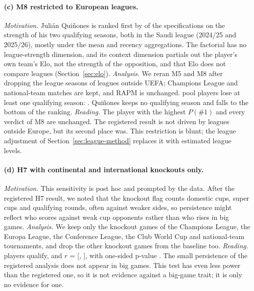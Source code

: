 \documentclass[11pt,a4paper]{article}
\begin{document}
\paragraph{(c) M8 restricted to European leagues.}
\emph{Motivation.} Julián Quiñones is ranked first by \QuinonesSpecShare{} of
the specifications on the strength of his two qualifying seasons, both in the
Saudi league (2024/25 and 2025/26), mostly under the mean and recency
aggregations. The
factorial has no league-strength dimension, and its context dimension partials
out the player's own team's Elo, not the strength of the opposition, and that
Elo does not compare leagues (Section~\ref{sec:elo}). \emph{Analysis.} We reran M5 and M8 after
dropping the league seasons of leagues outside UEFA; Champions League and
national-team matches are kept, and RAPM is unchanged. \NPoolLostSeasons{} pool
players lose at least one qualifying season: \EuropeLostPlayers{}. Quiñones keeps
no qualifying season and falls to the bottom of the ranking. \emph{Reading.}
The player with the highest $P(\#1)$ and every verdict of M8 are unchanged.
The registered result is not driven by leagues outside Europe, but its second
place was. This restriction is blunt; the league adjustment of
Section~\ref{sec:league-method} replaces it with estimated league levels.

\paragraph{(d) H7 with continental and international knockouts only.}
\emph{Motivation.} This sensitivity is post hoc and prompted by the data. After
the registered H7 result, we noted that the knockout flag counts domestic cups,
super cups and qualifying rounds, often against weaker sides, so persistence
might reflect who scores against weak cup opponents rather than who rises in
big games. \emph{Analysis.} We keep only the knockout games of the Champions
League, the Europa League, the Conference League, the Club World Cup and
national-team tournaments, and drop the other knockout games from the baseline
too. \emph{Reading.} \NPlayersClutchMajor{} players qualify, and $r$ =
\ClutchMajorR{} [\ClutchMajorRLo, \ClutchMajorRHi], with one-sided p-value
\ClutchMajorP{}. The small persistence of the registered analysis does not appear
in big games. This test has even less power than the registered one, so it is not
evidence against a big-game trait; it is only no evidence for one.
\end{document}
